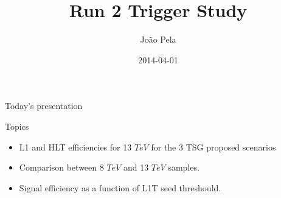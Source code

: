 \documentclass[8pt]{beamer}
\author[J. Pela]{João Pela}
\title{Run 2 Trigger Study}
\institute[ICL]{Imperial College London}
\date{2014-04-01}
\begin{document}
\setlength{\unitlength}{1mm}

\begin{frame}
  \titlepage
\end{frame}

\begin{frame}{Today's presentation}
 
\begin{block}{Topics}
 
\begin{itemize}
  \item L1 and HLT efficiencies for 13 $TeV$ for the 3 TSG proposed scenarios
  \item Comparison between 8 $TeV$ and 13 $TeV$ samples.
  \item Signal efficiency as a function of L1T seed threshould.
\end{itemize}
 
\end{block}

\end{frame}
\end{document}

